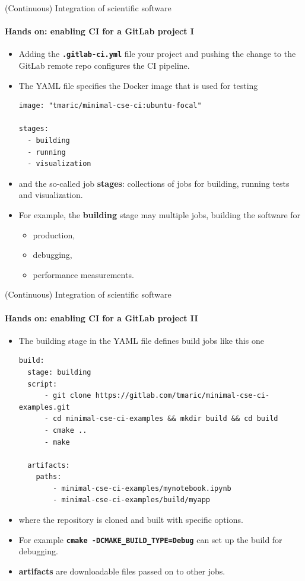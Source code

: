\begin{frame}[fragile]{(Continuous) Integration of scientific software} 
    \framesubtitle{Hands on: enabling CI for a GitLab project I} 
    \vfill

    \begin{itemize}
        \item Adding the \textbf{\texttt{.gitlab-ci.yml}} file your project and pushing the change to the GitLab remote repo configures the CI pipeline.
        \item The YAML file specifies the Docker image that is used for testing 
            \begin{verbatim}
image: "tmaric/minimal-cse-ci:ubuntu-focal"

stages:
  - building
  - running
  - visualization
            \end{verbatim}
        \item and the so-called job \textbf{stages}: collections of jobs for building, running tests and visualization. 
        \item For example, the \textbf{building} stage may multiple jobs, building the software for 
            \begin{itemize}
                \item production,
                \item debugging,
                \item performance measurements.
            \end{itemize}
    \end{itemize}

\end{frame}

\begin{frame}[fragile]{(Continuous) Integration of scientific software} 
    \framesubtitle{Hands on: enabling CI for a GitLab project II} 
    \vfill

    \begin{itemize}
        \item The building stage in the YAML file defines build jobs like this one
            \begin{verbatim}
build:
  stage: building
  script:
      - git clone https://gitlab.com/tmaric/minimal-cse-ci-examples.git
      - cd minimal-cse-ci-examples && mkdir build && cd build 
      - cmake .. 
      - make

  artifacts:
    paths:
        - minimal-cse-ci-examples/mynotebook.ipynb
        - minimal-cse-ci-examples/build/myapp

            \end{verbatim}
        \item where the repository is cloned and built with specific options.  
        \item For example \textbf{\texttt{cmake -DCMAKE\_BUILD\_TYPE=Debug}} can set up the build for debugging. 
        \item \textbf{artifacts} are downloadable files passed on to other jobs.
    \end{itemize}

\end{frame}

